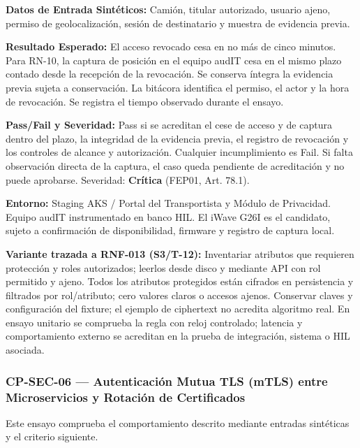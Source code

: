 \par\noindent\textbf{Datos de Entrada Sintéticos:} Camión, titular autorizado, usuario ajeno, permiso de geolocalización, sesión de destinatario y muestra de evidencia previa.\par
\par\noindent\textbf{Resultado Esperado:} El acceso revocado cesa en no más de cinco minutos. Para RN-10, la captura de posición en el equipo audIT cesa en el mismo plazo contado desde la recepción de la revocación. Se conserva íntegra la evidencia previa sujeta a conservación. La bitácora identifica el permiso, el actor y la hora de revocación. Se registra el tiempo observado durante el ensayo.\par
\par\noindent\textbf{Pass/Fail y Severidad:} Pass si se acreditan el cese de acceso y de captura dentro del plazo, la integridad de la evidencia previa, el registro de revocación y los controles de alcance y autorización. Cualquier incumplimiento es Fail. Si falta observación directa de la captura, el caso queda pendiente de acreditación y no puede aprobarse. Severidad: \textbf{Crítica} (FEP01, Art. 78.1).\par
\par\noindent\textbf{Entorno:} Staging AKS / Portal del Transportista y Módulo de Privacidad. Equipo audIT instrumentado en banco HIL. El iWave G26I es el candidato, sujeto a confirmación de disponibilidad, firmware y registro de captura local.\par

\par\noindent\textbf{Variante trazada a RNF-013 (S3/T-12):} Inventariar atributos que requieren protección y roles autorizados; leerlos desde disco y mediante API con rol permitido y ajeno. Todos los atributos protegidos están cifrados en persistencia y filtrados por rol/atributo; cero valores claros o accesos ajenos. Conservar claves y configuración del fixture; el ejemplo de ciphertext no acredita algoritmo real. En ensayo unitario se comprueba la regla con reloj controlado; latencia y comportamiento externo se acreditan en la prueba de integración, sistema o HIL asociada.\par
\subsubsection*{CP-SEC-06 — Autenticación Mutua TLS (mTLS) entre Microservicios y Rotación de Certificados}\label{sec:9-cp-sec-06}
Este ensayo comprueba el comportamiento descrito mediante entradas sintéticas y el criterio siguiente.

